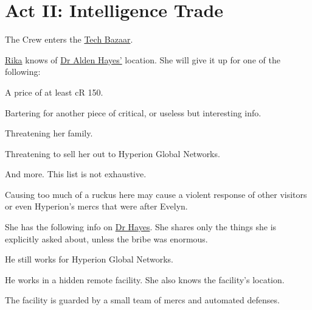 \chapter{Act II: Intelligence Trade}
\label{ch:act2}
The Crew enters the \hyperref[location:techbazaar]{Tech Bazaar}.
\par
\hyperref[char:rika]{Rika} knows of \hyperref[char:hayes]{Dr Alden Hayes'} location.
She will give it up for one of the following:
\begin{sitemize}
	\item A price of at least cR 150.
	\item Bartering for another piece of critical, or useless but interesting info.
	\item Threatening her family.
	\item Threatening to sell her out to Hyperion Global Networks.
	\item And more.
		This list is not exhaustive.
\end{sitemize}

Causing too much of a ruckus here
	may cause a violent response of other visitors
	or even Hyperion's mercs that were after Evelyn.

She has the following info on \hyperref[char:hayes]{Dr Hayes}.
She shares only the things she is explicitly asked about,
	unless the bribe was enormous.
\begin{sitemize}
	\item He still works for Hyperion Global Networks.
	\item He works in a hidden remote facility.
		She also knows the facility's location.
	\item The facility is guarded by a small team of mercs and automated defenses.
\end{sitemize}
